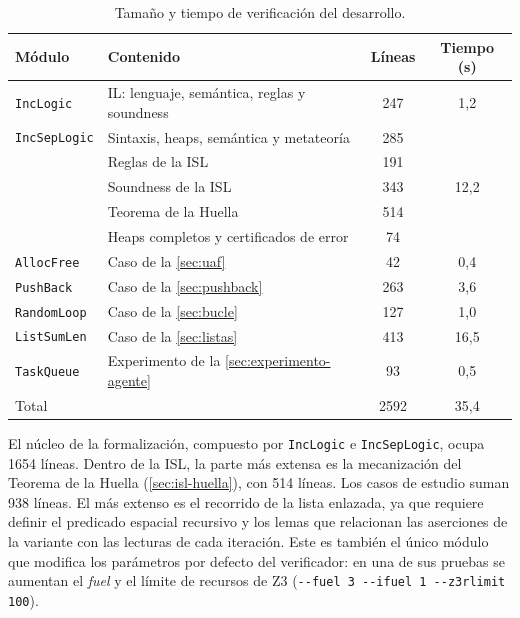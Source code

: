 \documentclass[a4paper,	11pt]{report}
\begin{document}
\begin{table}[ht]
  \centering
  \begin{tabular}{llcc}
    \hline
    Módulo & Contenido & Líneas & Tiempo (s) \\
    \hline
    \lstinline|IncLogic|    & IL: lenguaje, semántica, reglas y soundness & 247 & 1,2  \\
    \hline
    \lstinline|IncSepLogic| & Sintaxis, heaps, semántica y metateoría & 285 & \multirow{5}{*}{12,2} \\
                            & Reglas de la ISL                        & 191 & \\
                            & Soundness de la ISL                     & 343 & \\
                            & Teorema de la Huella                    & 514 & \\
                            & Heaps completos y certificados de error & 74 & \\
    \hline
    \lstinline|AllocFree| & Caso de la \autoref{sec:uaf} & 42 & 0,4 \\
    \lstinline|PushBack| & Caso de la \autoref{sec:pushback} & 263 & 3,6 \\
    \lstinline|RandomLoop| & Caso de la \autoref{sec:bucle} & 127 & 1,0 \\
    \lstinline|ListSumLen| & Caso de la \autoref{sec:listas} & 413 & 16,5 \\
    \lstinline|TaskQueue| & Experimento de la \autoref{sec:experimento-agente} & 93 & 0,5 \\
    \hline
    \multicolumn{2}{l}{Total} & 2592 & 35,4 \\
    \hline
  \end{tabular}
  \caption{Tamaño y tiempo de verificación del desarrollo.}
  \label{tab:desarrollo}
\end{table}

El núcleo de la formalización,
compuesto por \lstinline|IncLogic| e \lstinline|IncSepLogic|,
ocupa 1654 líneas.
Dentro de la ISL,
la parte más extensa es la mecanización del Teorema de la Huella (\autoref{sec:isl-huella}),
con 514 líneas.
Los casos de estudio suman 938 líneas.
El más extenso es el recorrido de la lista enlazada,
ya que requiere definir el predicado espacial recursivo y los lemas que relacionan las aserciones de la variante con las lecturas de cada iteración.
Este es también el único módulo que modifica los parámetros por defecto del verificador:
en una de sus pruebas se aumentan el \emph{fuel} y el límite de recursos de Z3 (\lstinline|--fuel 3 --ifuel 1 --z3rlimit 100|).
\end{document}
